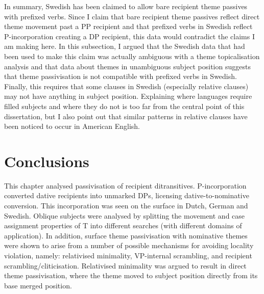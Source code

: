 In summary, Swedish has been claimed to allow bare recipient theme passives with prefixed verbs. Since I claim that bare recipient theme passives reflect direct theme movement past a PP recipient and that prefixed verbs in Swedish reflect P-incorporation creating a DP recipient, this data would contradict the claims I am making here. In this subsection, I argued that the Swedish data that had been used to make this claim was actually ambiguous with a theme topicalisation analysis and that data about themes in unambiguous subject position suggests that theme passivisation is not compatible with prefixed verbs in Swedish. Finally, this requires that some clauses in Swedish (especially relative clauses) may not have anything in subject position. Explaining where languages require filled subjects and where they do not is too far from the central point of this dissertation, but I also point out that similar patterns in relative clauses have been noticed to occur in American English.

\section{Conclusions}
This chapter analysed passivisation of recipient ditransitives. P-incorporation converted dative recipients into unmarked DPs, licensing dative-to-nominative conversion. This incorporation was seen on the surface in Dutch, German and Swedish. Oblique subjects were analysed by splitting the movement and case assignment properties of T into different searches (with different domains of application). In addition, surface theme passivisation with nominative themes were shown to arise from a number of possible mechanisms for avoiding locality violation, namely: relativised minimality, VP-internal scrambling, and recipient scrambling/cliticisation. Relativised minimality was argued to result in direct theme passivisation, where the theme moved to subject position directly from its base merged position.

%
